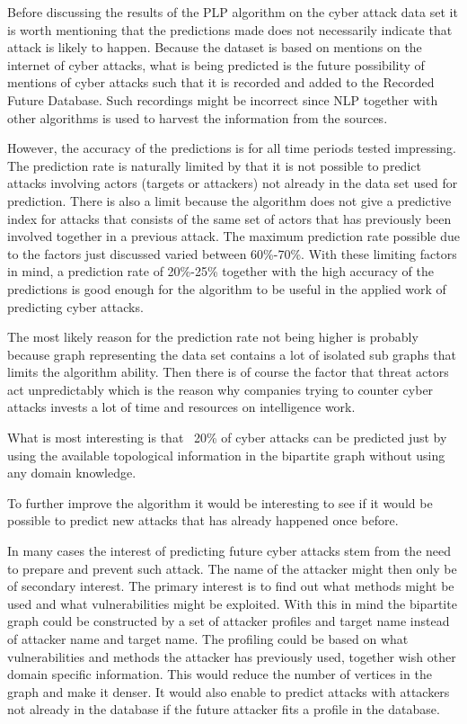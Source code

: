 
Before discussing the results of the PLP algorithm on the cyber attack data set it is worth mentioning that the predictions made does not necessarily indicate that attack is likely to happen. Because the dataset is based on mentions on the internet of cyber attacks, what is being predicted is the future possibility of mentions of cyber attacks such that it is recorded and added to the Recorded Future Database. Such recordings might be incorrect since NLP together with other algorithms is used to harvest the information from the sources.

However, the accuracy of the predictions is for all time periods tested impressing. The prediction rate is naturally limited by that it is not possible to predict attacks involving actors (targets or attackers) not already in the data set used for prediction. There is also a limit because the algorithm does not give a predictive index for attacks that consists of the same set of actors that has previously been involved together in a previous attack. The maximum prediction rate possible due to the factors just discussed varied between 60\%-70\%. With these limiting factors in mind, a prediction rate of 20\%-25\% together with the high accuracy of the predictions is good enough for the algorithm to be useful in the applied work of predicting cyber attacks.

The most likely reason for the prediction rate not being higher is probably because graph representing the data set contains a lot of isolated sub graphs that limits the algorithm ability. Then there is of course the factor that threat actors act unpredictably which is the reason why companies trying to counter cyber attacks invests a lot of time and resources on intelligence work.

What is most interesting is that ~20\% of cyber attacks can be predicted just by using the available topological information in the bipartite graph without using any domain knowledge.

To further improve the algorithm it would be interesting to see if it would be possible to predict new attacks that has already happened once before.

In many cases the interest of predicting future cyber attacks stem from the need to prepare and prevent such attack. The name of the attacker might then only be of secondary interest. The primary interest is to find out what methods might be used and what vulnerabilities might be exploited. With this in mind the bipartite graph could be constructed by a set of attacker profiles and target name instead of attacker name and target name. The profiling could be based on what vulnerabilities and methods the attacker has previously used, together wish other domain specific information. This would reduce the number of vertices in the graph and make it denser. It would also enable to predict attacks with attackers not already in the database if the future attacker fits a profile in the database.
